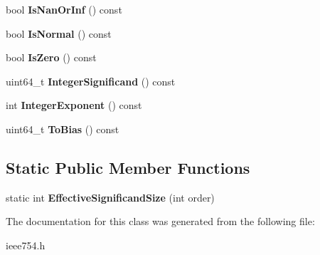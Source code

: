\begin{DoxyCompactItemize}
bool {\bfseries Is\+Nan\+Or\+Inf} () const
\item 
\mbox{\label{a02256_a8a39cd42010c69681da35d87f1331381}} 
bool {\bfseries Is\+Normal} () const
\item 
\mbox{\label{a02256_a90a3a1ca614b377b59576955ce987ce2}} 
bool {\bfseries Is\+Zero} () const
\item 
\mbox{\label{a02256_a1bf89d77be843f69facec9f2bc4dbc72}} 
uint64\+\_\+t {\bfseries Integer\+Significand} () const
\item 
\mbox{\label{a02256_a9721e0fdedef4d0fe6c7b411492a88fb}} 
int {\bfseries Integer\+Exponent} () const
\item 
\mbox{\label{a02256_ab3d3a81274e4f4b9b415db7c664d3ac9}} 
uint64\+\_\+t {\bfseries To\+Bias} () const
\end{DoxyCompactItemize}
\subsection*{Static Public Member Functions}
\begin{DoxyCompactItemize}
\item 
\mbox{\label{a02256_aa710fa4f5e06b0ff4348a13475688f13}} 
static int {\bfseries Effective\+Significand\+Size} (int order)
\end{DoxyCompactItemize}


The documentation for this class was generated from the following file\+:\begin{DoxyCompactItemize}
\item 
ieee754.\+h\end{DoxyCompactItemize}
